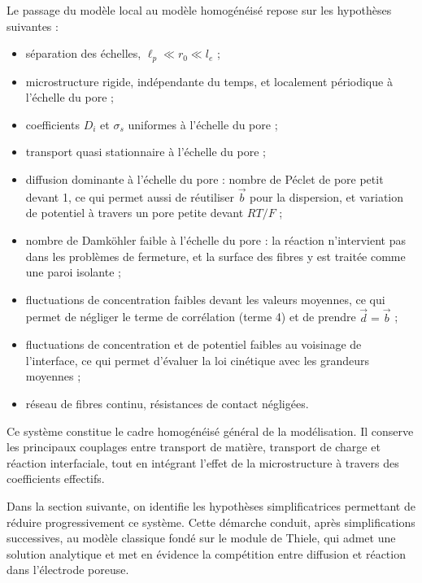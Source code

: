 Le passage du modèle local au modèle homogénéisé repose sur les hypothèses
suivantes :
\begin{itemize}
    \item séparation des échelles, $\ell_p \ll r_0 \ll l_e$ ;
    \item microstructure rigide, indépendante du temps, et localement
    périodique à l'échelle du pore ;
    \item coefficients $D_i$ et $\sigma_s$ uniformes à l'échelle du pore ;
    \item transport quasi stationnaire à l'échelle du pore ;
    \item diffusion dominante à l'échelle du pore : nombre de Péclet de
    pore petit devant 1, ce qui permet aussi de réutiliser $\vec{b}$ pour
    la dispersion, et variation de potentiel à travers un pore petite
    devant $RT/F$ ;
    \item nombre de Damköhler faible à l'échelle du pore : la réaction
    n'intervient pas dans les problèmes de fermeture, et la surface des
    fibres y est traitée comme une paroi isolante ;
    \item fluctuations de concentration faibles devant les valeurs moyennes,
    ce qui permet de négliger le terme de corrélation (terme 4) et de
    prendre $\vec{d} = \vec{b}$ ;
    \item fluctuations de concentration et de potentiel faibles au
    voisinage de l'interface, ce qui permet d'évaluer la loi cinétique
    avec les grandeurs moyennes ;
    \item réseau de fibres continu, résistances de contact négligées.
\end{itemize}

\bigskip
Ce système constitue le cadre homogénéisé général de la modélisation. Il
conserve les principaux couplages entre transport de matière, transport de
charge et réaction interfaciale, tout en intégrant l'effet de la microstructure
à travers des coefficients effectifs.

Dans la section suivante, on identifie les hypothèses simplificatrices permettant
de réduire progressivement ce système. Cette démarche conduit, après simplifications
successives, au modèle classique fondé sur le module de Thiele, qui admet une solution
analytique et met en évidence la compétition entre diffusion et réaction dans
l'électrode poreuse.